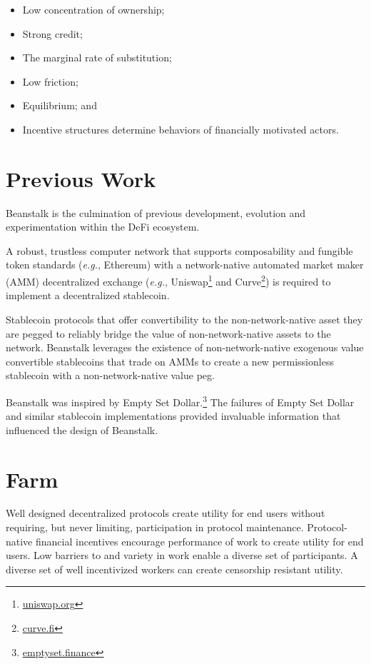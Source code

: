 \documentclass[tikz]{article}
\newcommand{\term}[1]{\textsl{#1}}
\newcommand{\fref}[1]{\footnote{\href{http://#1}{#1}}}
\begin{document}
\begin{itemize}[midsep]
    \item Low concentration of ownership;
    \item Strong credit;
    \item The marginal rate of substitution;
    \item Low friction;
    \item Equilibrium; and
    \item Incentive structures determine behaviors of financially motivated actors.
\end{itemize}


\section{Previous Work}

Beanstalk is the culmination of previous development, evolution and experimentation within the DeFi ecosystem. 

A robust, trustless computer network that supports composability and fungible token standards (\term{e.g.}, Ethereum) with a network-native automated market maker (AMM) decentralized exchange (\term{e.g.}, Uniswap\fref{uniswap.org} and Curve\fref{curve.fi}) is required to implement a decentralized stablecoin. 

Stablecoin protocols that offer convertibility to the non-network-native asset they are pegged to reliably bridge the value of non-network-native assets to the network. Beanstalk leverages the existence of non-network-native exogenous value convertible stablecoins that trade on AMMs to create a new permissionless stablecoin with a non-network-native value peg.

Beanstalk was inspired by Empty Set Dollar.\fref{emptyset.finance} The failures of Empty Set Dollar and similar stablecoin implementations provided invaluable information that influenced the design of Beanstalk.


\section{Farm}

Well designed decentralized protocols create utility for end users without requiring, but never limiting, participation in protocol maintenance. Protocol-native financial incentives encourage performance of work to create utility for end users. Low barriers to and variety in work enable a diverse set of participants. A diverse set of well incentivized workers can create censorship resistant utility. 
\end{document}
